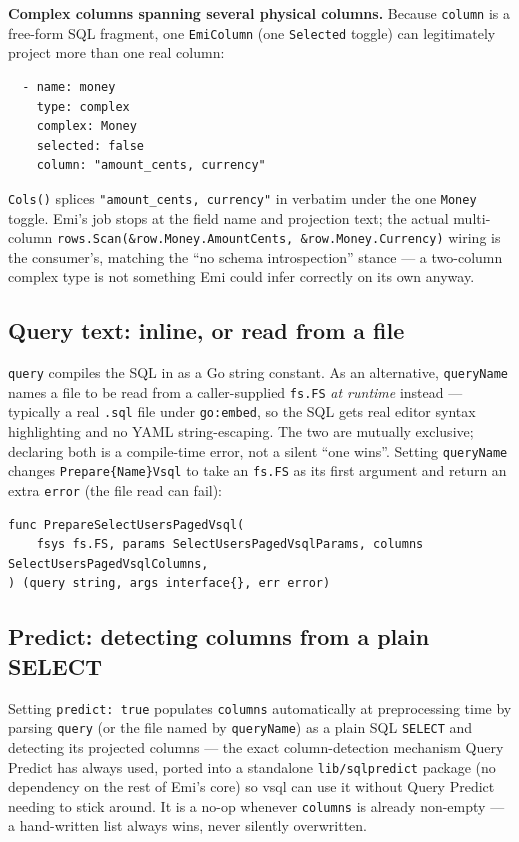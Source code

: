 \textbf{Complex columns spanning several physical columns.} Because
\texttt{column} is a free-form SQL fragment, one \texttt{EmiColumn}
(one \texttt{Selected} toggle) can legitimately project more than one
real column:

\begin{lstlisting}
  - name: money
    type: complex
    complex: Money
    selected: false
    column: "amount_cents, currency"
\end{lstlisting}

\texttt{Cols()} splices \texttt{"amount\_cents, currency"} in
verbatim under the one \texttt{Money} toggle. Emi's job stops at the
field name and projection text; the actual multi-column
\texttt{rows.Scan(\&row.Money.AmountCents, \&row.Money.Currency)}
wiring is the consumer's, matching the ``no schema introspection''
stance --- a two-column complex type is not something Emi could infer
correctly on its own anyway.

\subsection{Query text: inline, or read from a file}
\texttt{query} compiles the SQL in as a Go string constant. As an
alternative, \texttt{queryName} names a file to be read from a
caller-supplied \texttt{fs.FS} \emph{at runtime} instead --- typically
a real \texttt{.sql} file under \texttt{go:embed}, so the SQL gets
real editor syntax highlighting and no YAML string-escaping. The two
are mutually exclusive; declaring both is a compile-time error, not a
silent ``one wins''. Setting \texttt{queryName} changes
\texttt{Prepare\{Name\}Vsql} to take an \texttt{fs.FS} as its first
argument and return an extra \texttt{error} (the file read can fail):

\begin{lstlisting}
func PrepareSelectUsersPagedVsql(
    fsys fs.FS, params SelectUsersPagedVsqlParams, columns SelectUsersPagedVsqlColumns,
) (query string, args interface{}, err error)
\end{lstlisting}

\subsection{Predict: detecting columns from a plain SELECT}
\label{sec:vsql-predict}
Setting \texttt{predict: true} populates \texttt{columns}
automatically at preprocessing time by parsing \texttt{query} (or the
file named by \texttt{queryName}) as a plain SQL \texttt{SELECT} and
detecting its projected columns --- the exact column-detection
mechanism Query Predict has always used, ported into a standalone
\texttt{lib/sqlpredict} package (no dependency on the rest of Emi's
core) so vsql can use it without Query Predict needing to stick
around. It is a no-op whenever \texttt{columns} is already non-empty
--- a hand-written list always wins, never silently overwritten.


